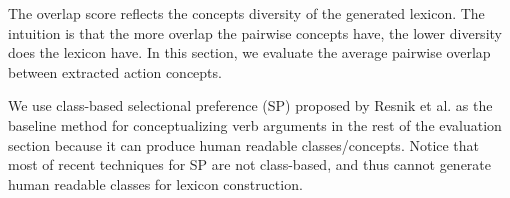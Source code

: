 %

The overlap score reflects the concepts diversity of the generated lexicon.
The intuition is that the more overlap the pairwise concepts have,
the lower diversity does the lexicon have.
In this section, we evaluate the average pairwise overlap between
extracted action concepts.

We use class-based selectional preference (SP) proposed by
Resnik et al.
as the baseline method for conceptualizing verb arguments in the rest of
the evaluation section because it can
produce human readable classes/concepts.
Notice that most of recent techniques for SP are not class-based,
and thus cannot generate human readable classes for lexicon
construction.

